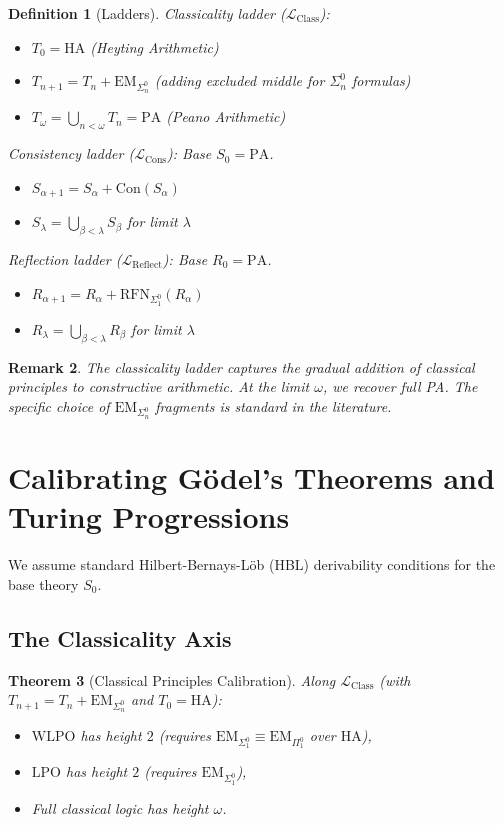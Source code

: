 \documentclass[11pt]{article}
\newtheorem{theorem}{Theorem}[section]
\newtheorem{definition}[theorem]{Definition}
\newtheorem{remark}[theorem]{Remark}
\newcommand{\PA}{\mathrm{PA}}
\newcommand{\HA}{\mathrm{HA}}
\newcommand{\Con}{\mathrm{Con}}
\newcommand{\RFNSigOne}{\mathrm{RFN}_{\Sigma^0_1}}
\newcommand{\LCons}{\mathcal{L}_{\mathrm{Cons}}}
\newcommand{\LReflect}{\mathcal{L}_{\mathrm{Reflect}}}
\newcommand{\LClass}{\mathcal{L}_{\mathrm{Class}}}
\newcommand{\EM}{\mathrm{EM}}
\newcommand{\LPO}{\mathrm{LPO}}
\newcommand{\WLPO}{\mathrm{WLPO}}
\begin{document}
\begin{definition}[Ladders]
\emph{Classicality ladder ($\LClass$):} 
\begin{itemize}
\item $T_0 = \HA$ (Heyting Arithmetic)
\item $T_{n+1} = T_n + \EM_{\Sigma^0_n}$ (adding excluded middle for $\Sigma^0_n$ formulas)
\item $T_\omega = \bigcup_{n<\omega} T_n = \PA$ (Peano Arithmetic)
\end{itemize}

\emph{Consistency ladder ($\LCons$):} Base $S_0=\PA$.
\begin{itemize}
\item $S_{\alpha+1} = S_\alpha + \Con(S_\alpha)$
\item $S_\lambda = \bigcup_{\beta<\lambda} S_\beta$ for limit $\lambda$
\end{itemize}

\emph{Reflection ladder ($\LReflect$):} Base $R_0=\PA$.
\begin{itemize}
\item $R_{\alpha+1} = R_\alpha + \RFNSigOne(R_\alpha)$
\item $R_\lambda = \bigcup_{\beta<\lambda} R_\beta$ for limit $\lambda$
\end{itemize}
\end{definition}

\begin{remark}
The classicality ladder captures the gradual addition of classical principles to constructive arithmetic. At the limit $\omega$, we recover full PA. The specific choice of $\EM_{\Sigma^0_n}$ fragments is standard in the literature.
\end{remark}

\section{Calibrating Gödel's Theorems and Turing Progressions}
We assume standard Hilbert-Bernays-Löb (HBL) derivability conditions for the base theory $S_0$.

\subsection{The Classicality Axis}
\begin{theorem}[Classical Principles Calibration]
Along $\LClass$ (with $T_{n+1}=T_n+\EM_{\Sigma^0_n}$ and $T_0=\HA$):
\begin{itemize}
\item $\WLPO$ has height $2$ (requires $\EM_{\Sigma^0_1}\!\equiv\!\EM_{\Pi^0_1}$ over $\HA$),
\item $\LPO$ has height $2$ (requires $\EM_{\Sigma^0_1}$),
\item Full classical logic has height $\omega$.
\end{itemize}
\end{theorem}
\end{document}
